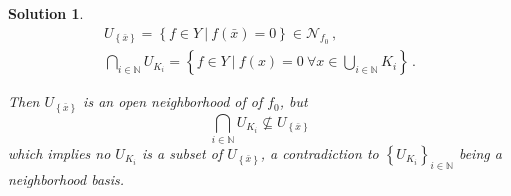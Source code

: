 \documentclass{article}                                                        %
\newtheorem{loesung}{Solution}                                                 %
\begin{document}
\begin{loesung}
  \begin{gather*}
    U_{\left\{ \bar{x} \right\}} = 
    \left\{ f \in Y\ \vert\ f(\bar{x}) = 0 \right\}
    \in \mathcal{N}_{f_0}\,, \\
    \bigcap\limits_{i\in\mathbb{N}} U_{K_i} = 
    \left\{ f \in Y\ \vert\ f(x) = 0\ 
    \forall x \in \bigcup\limits_{i\in\mathbb{N}} K_i \right\}\,.
  \end{gather*}
  
  Then $U_{\left\{ \bar{x} \right\}}$ is an open neighborhood of of $f_0$, but
  $$\bigcap\limits_{i\in\mathbb{N}} U_{K_i} 
  \not\subseteq U_{\left\{ \bar{x} \right\}}$$ which implies no $U_{K_i}$ is 
  a subset of $U_{\left\{ \bar{x} \right\}}$, a contradiction to 
  $\left\{ U_{K_i} \right\}_{i\in\mathbb{N}}$ being a neighborhood basis.

\end{loesung}                                                                  %
\end{document}
